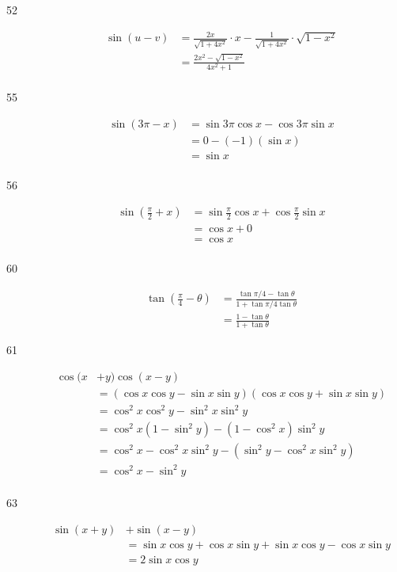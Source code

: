 \documentclass[fleqn,addpoints]{exam}
\begin{document}
\begin{description}
\item[52]
\begin{align*}
  \sin(u-v) &= \frac{2x}{\sqrt{1 + 4x^2}} \cdot x - \frac{1}{\sqrt{1 + 4x^2}} \cdot \sqrt{1-x^2} \\
  &= \frac{2x^2 - \sqrt{1 - x^2}}{4x^2 + 1} \\
\end{align*}

\item[55]
\begin{align*}
  \sin(3 \pi - x) &= \sin 3 \pi \cos x - \cos 3 \pi \sin x \\
  &= 0 - (-1)(\sin x) \\
  &= \sin x \\
\end{align*}

\item[56]
\begin{align*}
  \sin \left( \frac{\pi}{2} + x \right) &= \sin \frac{\pi}{2} \cos x + \cos \frac{\pi}{2} \sin x \\
  &= \cos x + 0 \\
  &= \cos x \\
\end{align*}

\item[60]
\begin{align*}
  \tan \left( \frac{\pi}{4} - \theta \right) &= \frac{\tan \pi/4 - \tan \theta}{1 + \tan \pi/4 \tan \theta} \\
  &= \frac{1 - \tan \theta}{1 + \tan \theta}
\end{align*}

\item[61]
\begin{align*}
  \cos(x &+ y) \cos(x-y) \\
  &= (\cos x \cos y - \sin x \sin y)(\cos x \cos y + \sin x \sin y) \\
  &= \cos^2 x \cos^2 y - \sin^2 x \sin^2 y \\
  &= \cos^2 x (1 - \sin^2 y) - (1 - \cos^2 x) \sin^2 y \\
  &= \cos^2 x - \cos^2 x \sin^2 y - (\sin^2 y - \cos^2x \sin^2 y) \\
  &= \cos^2 x - \sin^2 y \\
\end{align*}

\item[63]
\begin{align*}
  \sin(x+y) &+ \sin(x-y) \\
  &= \sin x \cos y + \cos x \sin y + \sin x \cos y - \cos x \sin y \\
  &= 2 \sin x \cos y \\
\end{align*}


\end{description}
\end{document}
